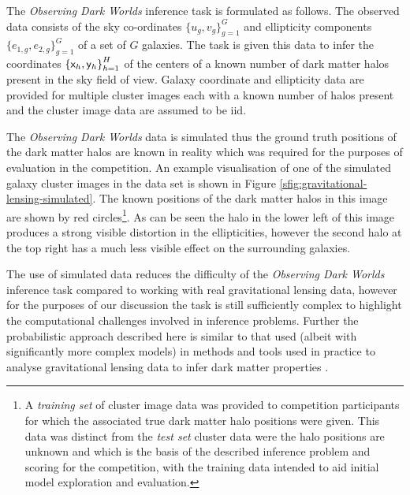 The \emph{Observing Dark Worlds} inference task is formulated as follows. The observed data consists of the sky co-ordinates $\lbrace u_g, v_g \rbrace_{g=1}^G$ and ellipticity components $\lbrace e_{1,g}, e_{2,g} \rbrace_{g=1}^G$ of a set of $G$ galaxies. The task is given this data to infer the coordinates $\lbr \rvar{x}_h, \rvar{y}_h\rbr_{h=1}^H$ of the centers of a known number of dark matter halos present in the sky field of view. Galaxy coordinate and ellipticity data are provided for multiple cluster images each with a known number of halos present and the cluster image data are assumed to be \ac{iid}.

The \emph{Observing Dark Worlds} data is simulated thus the ground truth positions of the dark matter halos are known in reality which was required for the purposes of evaluation in the competition. An example visualisation of one of the simulated galaxy cluster images in the data set is shown in Figure \ref{sfig:gravitational-lensing-simulated}. The known positions of the dark matter halos in this image are shown by red circles\footnote{A \emph{training set} of cluster image data was provided to competition participants for which the associated true dark matter halo positions were given. This data was distinct from the \emph{test set} cluster data were the halo positions are unknown and which is the basis of the described inference problem and scoring for the competition, with the training data intended to aid initial model exploration and evaluation.}. As can be seen the halo in the lower left of this image produces a strong visible distortion in the ellipticities, however the second halo at the top right has a much less visible effect on the surrounding galaxies. %

The use of simulated data 
 reduces the difficulty of the \emph{Observing Dark Worlds} inference task compared to working with real gravitational lensing data, however for the purposes of our discussion the task is still sufficiently complex to highlight the computational challenges involved in inference problems. Further the probabilistic approach described here is similar to that used (albeit with significantly more complex models) in methods and tools used in practice to analyse gravitational lensing data to infer dark matter properties \citep{marshall2003bayesian,jullo2007bayesian}.


